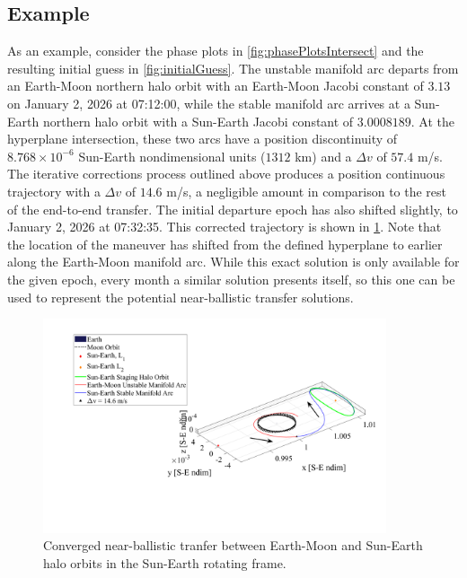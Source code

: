 \subsection{Example}
As an example, consider the phase plots in \cref{fig:phasePlotsIntersect} and the resulting initial
guess in \cref{fig:initialGuess}. The unstable manifold arc departs from an Earth-Moon northern
halo orbit with an Earth-Moon Jacobi constant of $3.13$ on January 2, 2026 at 07:12:00, while the
stable manifold arc arrives at a Sun-Earth northern halo orbit with a Sun-Earth Jacobi constant of
$3.0008189$. At the hyperplane intersection, these two arcs have a position discontinuity of
$8.768\times10^{-6}$ Sun-Earth nondimensional units ($1312$ km) and a $\Delta v$ of $57.4$ m/s. The
iterative corrections process outlined above produces a position continuous trajectory with a
$\Delta v$ of $14.6$ m/s, a negligible amount in comparison to the rest of the end-to-end transfer.
The initial departure epoch has also shifted slightly, to January 2, 2026 at 07:32:35. This
corrected trajectory is shown in \cref{fig:solution}. Note that the location of the maneuver has
shifted from the defined hyperplane to earlier along the Earth-Moon manifold arc. While this exact
solution is only available for the given epoch, every month a similar solution presents itself, so
this one can be used to represent the potential near-ballistic transfer solutions.

\begin{figure}[ht]
    \centering
    \includegraphics[width=0.9\textwidth]{figures/Solution.pdf}
    \caption{Converged near-ballistic tranfer between Earth-Moon and Sun-Earth halo orbits in the Sun-Earth rotating frame.}
    \label{fig:solution}
\end{figure}
